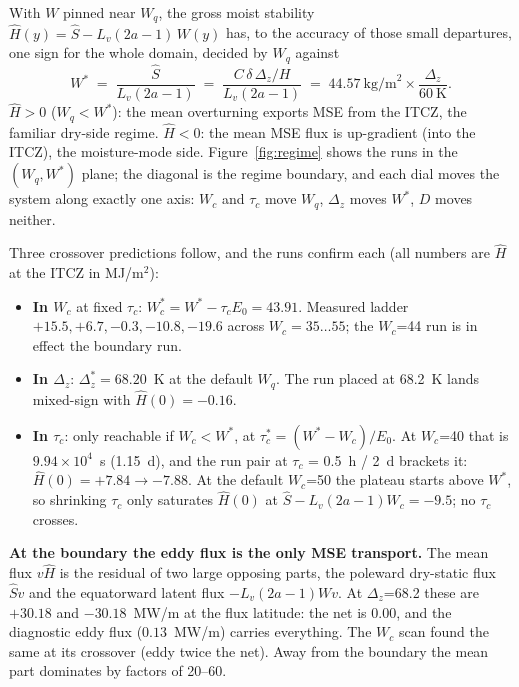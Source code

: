 \documentclass[11pt]{article}
\newcommand{\Shat}{\hat S}
\newcommand{\Hhat}{\hat H}
\newcommand{\Wq}{W_q}
\newcommand{\Wstar}{W^*}
\begin{document}
With $W$ pinned near $\Wq$, the gross moist stability
$\Hhat(y) = \Shat - L_v(2a{-}1)\,W(y)$ has, to the accuracy of those small
departures, one sign for the whole domain, decided by $\Wq$ against
\begin{equation}
\Wstar \;=\; \frac{\Shat}{L_v(2a{-}1)}
      \;=\; \frac{C\,\delta\,\Delta_z/H}{L_v(2a{-}1)}
      \;=\; 44.57~\text{kg/m}^2 \times \frac{\Delta_z}{60~\text{K}} .
\end{equation}
$\Hhat > 0$ ($\Wq < \Wstar$): the mean overturning exports MSE from the
ITCZ, the familiar dry-side regime. $\Hhat < 0$: the mean MSE flux is
up-gradient (into the ITCZ), the moisture-mode side. Figure~\ref{fig:regime}
shows the runs in the $(\Wq, \Wstar)$ plane; the diagonal is the
regime boundary, and each dial moves the system along exactly one axis:
$W_c$ and $\tau_c$ move $\Wq$, $\Delta_z$ moves $\Wstar$, $D$ moves
neither.

Three crossover predictions follow, and the runs confirm each
(all numbers are $\Hhat$ at the ITCZ in MJ/m$^2$):
\begin{itemize}
\item \textbf{In $W_c$} at fixed $\tau_c$: $W_c^* = \Wstar - \tau_c E_0 =
43.91$. Measured ladder $+15.5, +6.7, -0.3, -10.8, -19.6$ across
$W_c = 35 \ldots 55$; the $W_c$=44 run is in effect the boundary run.
\item \textbf{In $\Delta_z$}: $\Delta_z^* = 68.20$~K at the default $\Wq$.
The run placed at 68.2~K lands mixed-sign with $\Hhat(0) = -0.16$.
\item \textbf{In $\tau_c$}: only reachable if $W_c < \Wstar$, at
$\tau_c^* = (\Wstar - W_c)/E_0$. At $W_c$=40 that is $9.94\times10^4$~s
(1.15~d), and the run pair at $\tau_c$ = 0.5~h / 2~d brackets it:
$\Hhat(0) = +7.84 \to -7.88$. At the default $W_c$=50 the plateau starts
above $\Wstar$, so shrinking $\tau_c$ only saturates $\Hhat(0)$ at
$\Shat - L_v(2a{-}1)W_c = -9.5$; no $\tau_c$ crosses.
\end{itemize}

\textbf{At the boundary the eddy flux is the only MSE transport.} The mean
flux $v\Hhat$ is the residual of two large opposing parts, the poleward
dry-static flux $\Shat v$ and the equatorward latent flux $-L_v(2a{-}1)Wv$.
At $\Delta_z$=68.2 these are $+30.18$ and $-30.18$~MW/m at the flux
latitude: the net is $0.00$, and the diagnostic eddy flux
($0.13$~MW/m) carries everything. The $W_c$ scan found the same at its
crossover (eddy twice the net). Away from the boundary the mean part
dominates by factors of 20--60.
\end{document}
